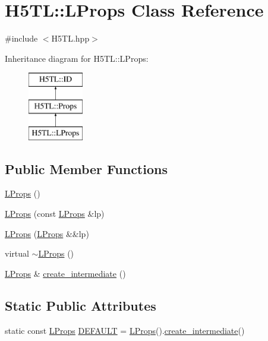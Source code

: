 \hypertarget{class_h5_t_l_1_1_l_props}{\section{H5\-T\-L\-:\-:L\-Props Class Reference}
\label{class_h5_t_l_1_1_l_props}
}


{\ttfamily \#include $<$H5\-T\-L.\-hpp$>$}

Inheritance diagram for H5\-T\-L\-:\-:L\-Props\-:\begin{figure}[H]
\begin{center}
\leavevmode
\includegraphics[height=3.000000cm]{class_h5_t_l_1_1_l_props}
\end{center}
\end{figure}
\subsection*{Public Member Functions}
\begin{DoxyCompactItemize}
\item 
\hyperlink{class_h5_t_l_1_1_l_props_a6604710a45e0f3cc1c124be10b3d8dac}{L\-Props} ()
\item 
\hyperlink{class_h5_t_l_1_1_l_props_a32b5f1fffdf3c896f5bf227bc16ef4d7}{L\-Props} (const \hyperlink{class_h5_t_l_1_1_l_props}{L\-Props} \&lp)
\item 
\hyperlink{class_h5_t_l_1_1_l_props_ad653b9016ec853a59877d154a963f4fe}{L\-Props} (\hyperlink{class_h5_t_l_1_1_l_props}{L\-Props} \&\&lp)
\item 
virtual \hyperlink{class_h5_t_l_1_1_l_props_aad7af2c22c381bfb797ba6571efd0979}{$\sim$\-L\-Props} ()
\item 
\hyperlink{class_h5_t_l_1_1_l_props}{L\-Props} \& \hyperlink{class_h5_t_l_1_1_l_props_aa517b340764074934db64700f5b8f904}{create\-\_\-intermediate} ()
\end{DoxyCompactItemize}
\subsection*{Static Public Attributes}
\begin{DoxyCompactItemize}
\item 
static const \hyperlink{class_h5_t_l_1_1_l_props}{L\-Props} \hyperlink{class_h5_t_l_1_1_l_props_a422b3afe8a1bdb74252157d7c0ae7d9b}{D\-E\-F\-A\-U\-L\-T} = \hyperlink{class_h5_t_l_1_1_l_props}{L\-Props}().\hyperlink{class_h5_t_l_1_1_l_props_aa517b340764074934db64700f5b8f904}{create\-\_\-intermediate}()
\end{DoxyCompactItemize}
